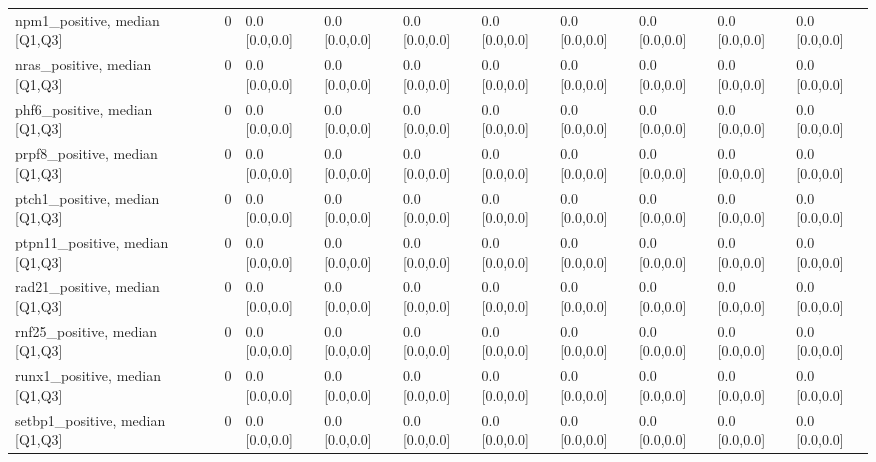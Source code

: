 \begin{tabular}{lllllllllll}
npm1\_positive, median [Q1,Q3] &    &                    0 &       0.0 [0.0,0.0] &      0.0 [0.0,0.0] &        0.0 [0.0,0.0] &       0.0 [0.0,0.0] &     0.0 [0.0,0.0] &     0.0 [0.0,0.0] &       0.0 [0.0,0.0] &        0.0 [0.0,0.0] \\
nras\_positive, median [Q1,Q3] &    &                    0 &       0.0 [0.0,0.0] &      0.0 [0.0,0.0] &        0.0 [0.0,0.0] &       0.0 [0.0,0.0] &     0.0 [0.0,0.0] &     0.0 [0.0,0.0] &       0.0 [0.0,0.0] &        0.0 [0.0,0.0] \\
phf6\_positive, median [Q1,Q3] &    &                    0 &       0.0 [0.0,0.0] &      0.0 [0.0,0.0] &        0.0 [0.0,0.0] &       0.0 [0.0,0.0] &     0.0 [0.0,0.0] &     0.0 [0.0,0.0] &       0.0 [0.0,0.0] &        0.0 [0.0,0.0] \\
prpf8\_positive, median [Q1,Q3] &    &                    0 &       0.0 [0.0,0.0] &      0.0 [0.0,0.0] &        0.0 [0.0,0.0] &       0.0 [0.0,0.0] &     0.0 [0.0,0.0] &     0.0 [0.0,0.0] &       0.0 [0.0,0.0] &        0.0 [0.0,0.0] \\
ptch1\_positive, median [Q1,Q3] &    &                    0 &       0.0 [0.0,0.0] &      0.0 [0.0,0.0] &        0.0 [0.0,0.0] &       0.0 [0.0,0.0] &     0.0 [0.0,0.0] &     0.0 [0.0,0.0] &       0.0 [0.0,0.0] &        0.0 [0.0,0.0] \\
ptpn11\_positive, median [Q1,Q3] &    &                    0 &       0.0 [0.0,0.0] &      0.0 [0.0,0.0] &        0.0 [0.0,0.0] &       0.0 [0.0,0.0] &     0.0 [0.0,0.0] &     0.0 [0.0,0.0] &       0.0 [0.0,0.0] &        0.0 [0.0,0.0] \\
rad21\_positive, median [Q1,Q3] &    &                    0 &       0.0 [0.0,0.0] &      0.0 [0.0,0.0] &        0.0 [0.0,0.0] &       0.0 [0.0,0.0] &     0.0 [0.0,0.0] &     0.0 [0.0,0.0] &       0.0 [0.0,0.0] &        0.0 [0.0,0.0] \\
rnf25\_positive, median [Q1,Q3] &    &                    0 &       0.0 [0.0,0.0] &      0.0 [0.0,0.0] &        0.0 [0.0,0.0] &       0.0 [0.0,0.0] &     0.0 [0.0,0.0] &     0.0 [0.0,0.0] &       0.0 [0.0,0.0] &        0.0 [0.0,0.0] \\
runx1\_positive, median [Q1,Q3] &    &                    0 &       0.0 [0.0,0.0] &      0.0 [0.0,0.0] &        0.0 [0.0,0.0] &       0.0 [0.0,0.0] &     0.0 [0.0,0.0] &     0.0 [0.0,0.0] &       0.0 [0.0,0.0] &        0.0 [0.0,0.0] \\
setbp1\_positive, median [Q1,Q3] &    &                    0 &       0.0 [0.0,0.0] &      0.0 [0.0,0.0] &        0.0 [0.0,0.0] &       0.0 [0.0,0.0] &     0.0 [0.0,0.0] &     0.0 [0.0,0.0] &       0.0 [0.0,0.0] &        0.0 [0.0,0.0] \\

\end{tabular}
